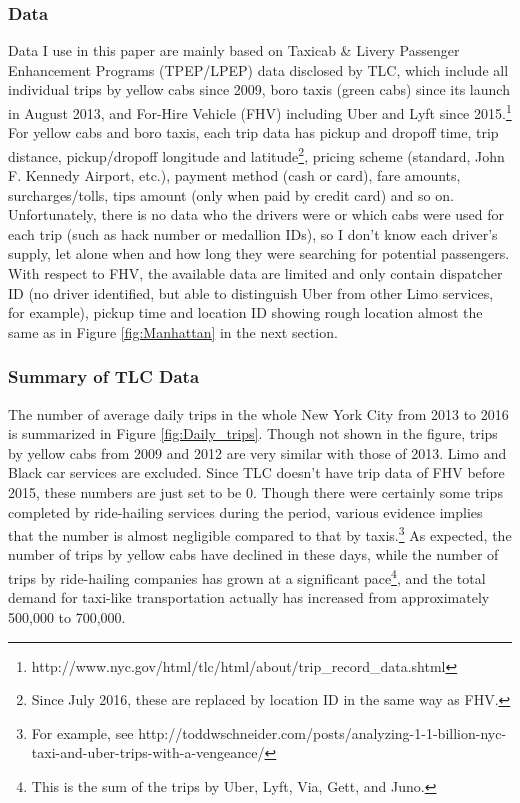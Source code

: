 \subsubsection{Data}
\hspace{0.5cm} Data I use in this paper are mainly based on Taxicab \& Livery Passenger Enhancement Programs (TPEP/LPEP) data disclosed by TLC, which include all individual trips by yellow cabs since 2009, boro taxis (green cabs) since its launch in August 2013, and For-Hire Vehicle (FHV) including Uber and Lyft since 2015.\footnote{http://www.nyc.gov/html/tlc/html/about/trip\_record\_data.shtml} For yellow cabs and boro taxis, each trip data has pickup and dropoff time, trip distance, pickup/dropoff longitude and latitude\footnote{Since July 2016, these are replaced by location ID in the same way as FHV.}, pricing scheme (standard, John F. Kennedy Airport, etc.), payment method (cash or card), fare amounts, surcharges/tolls, tips amount (only when paid by credit card) and so on. Unfortunately, there is no data who the drivers were or which cabs were used for each trip (such as hack number or medallion IDs), so I don’t know each driver’s supply, let alone when and how long they were searching for potential passengers. With respect to FHV, the available data are limited and only contain dispatcher ID (no driver identified, but able to distinguish Uber from other Limo services, for example), pickup time and location ID showing rough location almost the same as in Figure \ref{fig:Manhattan} in the next section. 

\subsubsection{Summary of TLC Data}
\hspace{0.5cm} The number of average daily trips in the whole New York City from 2013 to 2016 is summarized in Figure \ref{fig:Daily_trips}. Though not shown in the figure, trips by yellow cabs from 2009 and 2012 are very similar with those of 2013. Limo and Black car services are excluded. Since TLC doesn't have trip data of FHV before 2015, these numbers are just set to be 0. Though there were certainly some trips completed by ride-hailing services during the period, various evidence implies that the number is almost negligible compared to that by taxis.\footnote{For example, see http://toddwschneider.com/posts/analyzing-1-1-billion-nyc-taxi-and-uber-trips-with-a-vengeance/} As expected, the number of trips by yellow cabs have declined in these days, while the number of trips by ride-hailing companies has grown at a significant pace\footnote{This is the sum of the trips by Uber, Lyft, Via, Gett, and Juno.}, and the total demand for taxi-like transportation actually has increased from approximately 500,000 to 700,000.


